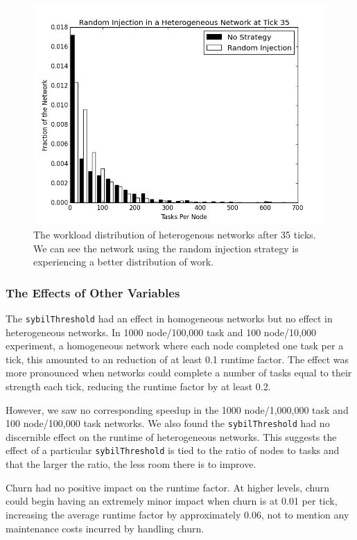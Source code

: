 \documentclass[11pt,conference]{IEEEtran}
\begin{document}
{	
	\begin{figure}
		\centering
		\includegraphics[width=0.7\linewidth]{figs/randomStableHistHetero35}
		\caption[Random injection in a Heterogenous Network]{The workload distribution of heterogenous networks after 35 ticks.  We can see the network using the random injection strategy is experiencing a better distribution of work.}
		\label{fig:randomStableHistHetero35}
	\end{figure}
	
	
	
	\subsubsection{The Effects of Other Variables}
	
	The \texttt{sybilThreshold} had an effect in homogeneous networks but no effect in heterogeneous networks.
	In 1000 node/100,000 task and 100 node/10,000 experiment, a homogeneous network where each node completed one task per a tick, this amounted to an reduction of at least 0.1 runtime factor.
	The effect was more pronounced when networks could complete a number of tasks equal to their strength each tick, reducing the runtime factor by at least 0.2.
	
	However, we saw no corresponding speedup in the 1000 node/1,000,000 task and 100 node/100,000 task networks.
	We also found the \texttt{sybilThreshold} had no discernible effect on the runtime of heterogeneous networks.
	This suggests the effect of a particular \texttt{sybilThreshold} is tied to the ratio of nodes to tasks and that the larger the ratio, the less room there is to improve.
	
	Churn had no positive impact on the runtime factor.
	At higher levels, churn could begin having an extremely minor impact when churn is at 0.01 per tick, increasing the average runtime factor by approximately 0.06, not to mention any maintenance costs incurred by handling churn.
	
}
\end{document}
